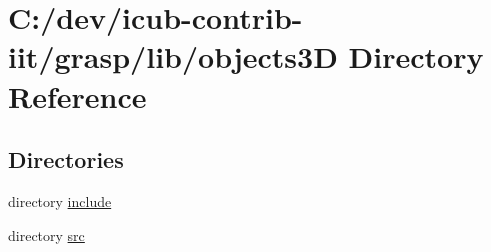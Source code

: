 \section{C\+:/dev/icub-\/contrib-\/iit/grasp/lib/objects3\+D Directory Reference}
\label{dir_b49e91218b0b14133bce8b305bc7a5c8}
\subsection*{Directories}
\begin{DoxyCompactItemize}
\item 
directory \hyperlink{dir_f4becebc399c8277de02e920ccd40b39}{include}
\item 
directory \hyperlink{dir_acc040bef4f47b30e250fa358a960c49}{src}
\end{DoxyCompactItemize}
